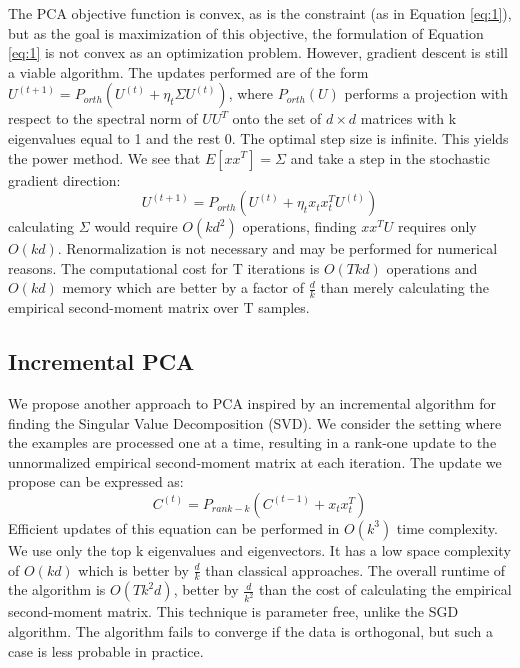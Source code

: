 \documentclass{article}
\begin{document}
The PCA objective function is convex, as is the constraint (as in Equation \ref{eq:1}), but as the goal is maximization of this objective, the formulation of Equation \ref{eq:1} is not convex as an optimization problem. However, gradient descent is still a viable algorithm. The updates performed are of the form $U^{\left( t+1\right) }=P_{orth}\left( U^{\left( t\right) }+\eta _{t}\Sigma U^{\left( t\right) }\right)$, where $P_{orth}(U)$ performs a projection with respect to the spectral norm of $UU^{T}$ onto the set of $d\times d$ matrices with k eigenvalues equal to 1 and the rest 0. The optimal step size is infinite. This yields the power method. We see that $E\left[ xx^{T}\right] =\Sigma $ and take a step in the stochastic gradient direction:
\begin{equation}
U^{\left( t+1\right) }=P_{orth}\left( U^{\left( t\right) }+\eta _{t}x_{t}x^{T}_{t}U^{\left( t\right) }\right) 
\end{equation}
calculating $\Sigma$ would require $O\left( kd^{2}\right)$ operations, finding $xx^{T}U$ requires only $O\left( kd\right)$. Renormalization is not necessary and may be performed for numerical reasons. The computational cost for T iterations is $O\left(Tkd\right)$ operations and $O\left(kd\right)$ memory which are better by a factor of $\frac{d}{k}$ than merely calculating the empirical second-moment matrix over T samples.

\subsection{Incremental PCA}
We propose another approach to PCA inspired by an incremental algorithm for finding the Singular Value Decomposition (SVD). We consider the setting where the examples are processed one at a time, resulting in a rank-one update to the unnormalized empirical second-moment matrix at each iteration. The update we propose can be expressed as:
\begin{equation}\label{eq:2} 
    C^{\left( t\right) }=P_{rank-k}\left( C^{\left( t-1\right) }+x_{t}x^{T}_{t}\right) 
\end{equation}
Efficient updates of this equation can be performed in $O\left( k^{3}\right)$ time complexity. We use only the top k eigenvalues and eigenvectors. It has a low space complexity of $O\left( kd\right)$ which is better by $\frac{d}{k}$ than classical approaches. The overall runtime of the algorithm is $O\left( Tk^{2}d\right)$, better by $\frac{d}{k^{2}}$ than the cost of calculating the empirical second-moment matrix. This technique is parameter free, unlike the SGD algorithm. The algorithm fails to converge if the data is orthogonal, but such a case is less probable in practice.
\end{document}
